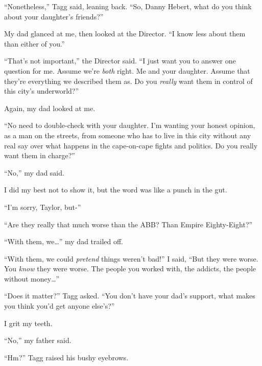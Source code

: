 ``Nonetheless,'' Tagg said, leaning back.  ``So, Danny Hebert, what do you think about your daughter's friends?''



My dad glanced at me, then looked at the Director.  ``I know less about them than either of you.''



``That's not important,'' the Director said.  ``I just want you to answer one question for me.  Assume we're \emph{both} right.  Me and your daughter.  Assume that they're everything we described them as.  Do you \emph{really} want them in control of this city's underworld?''



Again, my dad looked at me.



``No need to double-check with your daughter.  I'm wanting your honest opinion, as a man on the streets, from someone who has to live in this city without any real say over what happens in the cape-on-cape fights and politics.  Do you really want them in charge?''



``No,'' my dad said.



I did my best not to show it, but the word was like a punch in the gut.



``I'm sorry, Taylor, but-''



``Are they really that much worse than the ABB?  Than Empire Eighty-Eight?''



``With them, we\ldots'' my dad trailed off.



``With them, we could \emph{pretend }things weren't bad!'' I said, ``But they were worse.  You \emph{know} they were worse.  The people you worked with, the addicts, the people without money\ldots''



``Does it matter?'' Tagg asked.  ``You don't have your dad's support, what makes you think you'd get anyone else's?''



I grit my teeth.



``No,'' my father said.



``Hm?''  Tagg raised his bushy eyebrows.



